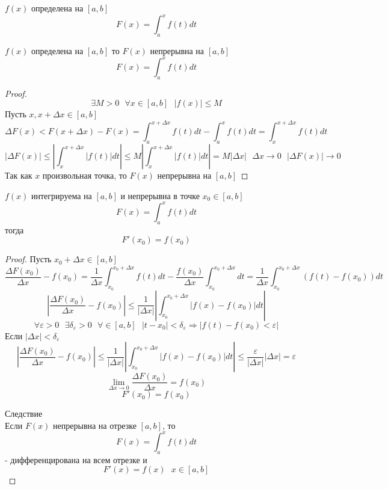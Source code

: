 $f(x)$ определена на $[a, b]$
\[F(x) = \int^x_a f(t)dt\]

\begin{theorem}
  $f(x)$ определена на $[a,b]$ то $F(x)$ непрерывна на $[a,b]$
  \[F(x) = \int^x_a f(t)dt\]
\end{theorem}

\begin{proof}
  \[\exists M > 0 ~~~ \forall x \in [a, b] ~~~ |f(x)| \le M\]
  Пусть $x, x + \Delta x \in [a, b]$
  \[\Delta F(x) < F(x + \Delta x) - F(x) = \int^{x + \Delta x}_a f(t)dt -
    \int^x_a f(t)dt = \int^{x + \Delta x}_x f(t)dt\]
  \[|\Delta F(x)| \le \left |\int^{x + \Delta x}_x |f(t)|dt \right| \le
    M \left |\int^{x + \Delta x}_x |f(t)| dt \right| = M |\Delta x|
    ~~~ \Delta x \to 0 ~~~ |\Delta F(x)| \to 0\]
  Так как $x$ произвольная точка, то $F(x)$ непрерывна на $[a,b]$
\end{proof}

\begin{theorem}
  $f(x)$ интегрируема на $[a,b]$ и непрерывна в точке $x_0 \in [a,b]$
  \[F(x) = \int^x_a f(t)dt\]
  тогда
  \[F'(x_0) = f(x_0)\]
\end{theorem}

\begin{proof}
  Пусть $x_0 + \Delta x \in [a, b]$
  \[\frac{\Delta F(x_0)}{\Delta x} - f(x_0) = \frac{1}{\Delta x}
    \int^{x_0 + \Delta x}_{x_0} f(t)dt - \frac{f(x_0)}{\Delta x}
    \int^{x_0 + \Delta x}_{x_0} dt = \frac{1}{\Delta x}
    \int^{x_0 + \Delta x}_{x_0} (f(t) - f(x_0))dt\]
  \[\left | \frac{\Delta F(x_0)}{\Delta x} - f(x_0)
    \right | \le \frac{1}{|\Delta x|} \left |
    \int^{x_0 + \Delta x}_{x_0} |f(x) - f(x_0)|dt \right |\]
  \[\forall \varepsilon > 0 ~~~ \exists \delta_\varepsilon > 0
    ~~~ \forall \in [a, b] ~~~ |t - x_0| < \delta_\varepsilon \Rightarrow
    |f(t) - f(x_0) < \varepsilon|\]
  Если $|\Delta x| < \delta_\varepsilon$
  \[\left | \frac{\Delta F(x_0)}{\Delta x} - f(x_0) \right | \le
    \frac{1}{|\Delta x|} \left | \int^{x_0 + \Delta x}_{x_0} |f(x) -
    f(x_0)|dt \right | \le \frac{\varepsilon}{|\Delta x|} |\Delta x| =
    \varepsilon\]
  \[\lim_{\Delta x \to 0} \frac{\Delta F(x_0)}{\Delta x} = f(x_0)\]
  \[F'(x_0) = f(x_0)\]

  Следствие\\
  Если $F(x)$ непрерывна на отрезке $[a, b]$, то
  \[F(x) = \int^x_a f(t)dt\] - дифференцирована на всем отрезке и
  \[F'(x) = f(x) ~~~ x \in [a, b]\]
\end{proof}

